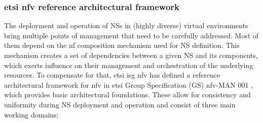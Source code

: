        \subsubsection{\acrshort{etsi} \acrshort{nfv} reference architectural framework}
        The deployment and operation of NSs in (highly diverse) virtual environments bring multiple points of management that need to be carefully addressed. Most of them depend on the \acrshort{nf} composition mechanism used for NS definition. This mechanism creates a set of dependencies between a given NS and its components, which exerts influence on their management and orchestration of the underlying resources. To compensate for that, \acrshort{etsi} \acrshort{isg} \acrshort{nfv} has defined a reference architectural framework for \acrshort{nfv} in \acrshort{etsi} Group Specification (GS) \acrshort{nfv}-MAN 001 \cite{ETSI_GS_NFV-MAN_001}, which provides basic architectural foundations. These allow for consistency and uniformity during NS deployment and operation and consist of three main working domains:
        

